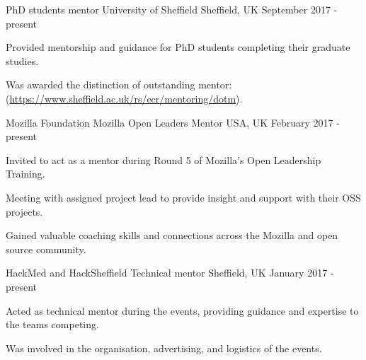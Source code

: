 


\begin{cventries}


\cventry
{PhD students mentor} %
{University of Sheffield} %
{Sheffield, UK} %
{September 2017 - present} %
{
\begin{cvitems}
\item{Provided mentorship and guidance for PhD students completing their graduate studies.}
\item{
Was awarded the distinction of outstanding mentor: (\url{https://www.sheffield.ac.uk/rs/ecr/mentoring/dotm}).}
\end{cvitems}
}

\cventry
{Mozilla Foundation}
{Mozilla Open Leaders Mentor}
{USA, UK}
{February 2017 - present}
{
\begin{cvitems}
\item{Invited to act as a mentor during Round 5 of Mozilla's Open Leadership Training.}
\item{Meeting with assigned project lead to provide insight and support with their OSS projects.}
\item{Gained valuable coaching skills and connections across the Mozilla and open source community.}
\end{cvitems}
}


\cventry
{HackMed and HackSheffield}
{Technical mentor}
{Sheffield, UK}
{January 2017 - present}
{
\begin{cvitems}
\item{Acted as technical mentor during the events, providing guidance and expertise to the teams competing.}
\item{Was involved in the organisation, advertising, and logistics of the events.}
\end{cvitems}
}


\end{cventries}